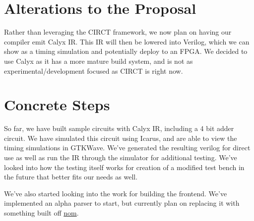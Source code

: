 \documentclass{article}
\begin{document}
\section{Alterations to the Proposal}
Rather than leveraging the CIRCT framework, we now plan on having our compiler
emit Calyx IR. This IR will then be lowered into Verilog, which we can show as
a timing simulation and potentially deploy to an FPGA. We decided to use Calyx
as it has a more mature build system, and is not as experimental/development
focused as CIRCT is right now.

\section{Concrete Steps}
So far, we have built sample circuits with Calyx IR, including a 4 bit adder
circuit. We have simulated this circuit using Icarus, and are able to view the
timing simulations in GTKWave. We've generated the resulting verilog for direct
use as well as run the IR through the simulator for additional testing. We've
looked into how the testing itself works for creation of a modified test bench
in the future that better fits our needs as well.

We've also started looking into the work for building the frontend. We've 
implemented an alpha parser to start, but currently plan on replacing it with
something built off \href{https://github.com/rust-bakery/nom}{nom}.
\end{document}
